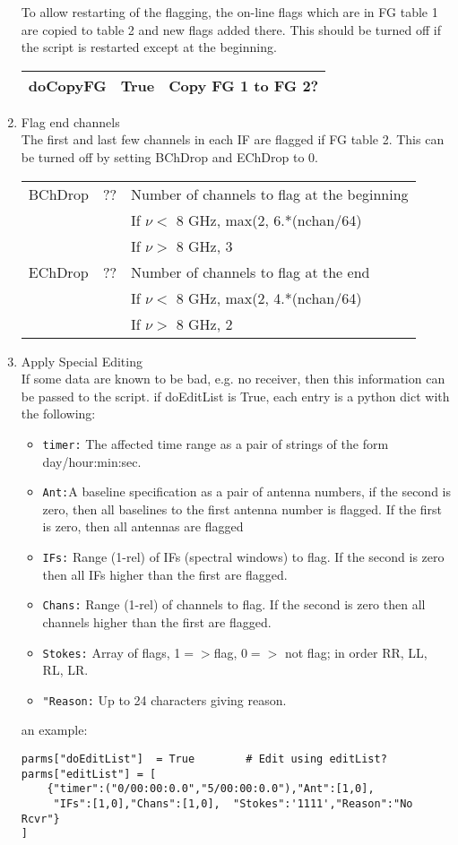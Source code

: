 \documentclass[11pt]{article}
\begin{document}
\begin{enumerate}
To allow restarting of the flagging, the on-line flags which are in FG
table 1 are copied to table 2 and new flags added there.
This should be turned off if the script is restarted except at the beginning.
\begin{center}
\begin{tabular}{|l|c|l|}
\hline
doCopyFG  & True & Copy FG 1 to FG 2? \\
\hline
\end{tabular}
\end{center}
%
\item Flag end channels\\
The first and last few channels in each IF are flagged if FG table 2.
This can be turned off by setting BChDrop and EChDrop to 0.
\begin{center}
\begin{tabular}{|l|c|l|}
\hline
BChDrop  & ?? & Number of channels to flag at the beginning \\
 & & If $\nu<$ 8 GHz, max(2, 6.*(nchan/64)\\
 & & If $\nu>$ 8 GHz, 3\\
EChDrop  & ?? & Number of channels to flag at the end \\
 & & If $\nu<$ 8 GHz, max(2, 4.*(nchan/64)\\
 & & If $\nu>$ 8 GHz, 2\\
\hline
\end{tabular}
\end{center}
%
%
\item Apply Special Editing\\
If some data are known to be bad, e.g. no receiver, then this
information can be passed to the script.
if doEditList is True, each entry is a python dict with the following:
\begin{itemize}
\item{\tt timer:} The affected time range as a pair of strings of the
form day/hour:min:sec.
\item{\tt Ant:}A baseline specification as a pair of antenna numbers,
if the second is zero, then all baselines to the first antenna number
is flagged.  
If the first is zero, then all antennas are flagged
\item{\tt IFs:} Range (1-rel)  of IFs (spectral windows) to flag.
If the second is zero then all IFs higher than the first are flagged.
\item{\tt Chans:} Range (1-rel) of channels to flag.
If the second is zero then all channels higher than the first are flagged.
\item{\tt Stokes:} Array of flags, 1$=>$flag, $0=>$ not flag; in order
  RR, LL, RL, LR.
\item{\tt "Reason:} Up to 24 characters giving reason.
\end{itemize}
an example:
\begin{verbatim}
parms["doEditList"]  = True        # Edit using editList?
parms["editList"] = [
    {"timer":("0/00:00:0.0","5/00:00:0.0"),"Ant":[1,0],
     "IFs":[1,0],"Chans":[1,0],  "Stokes":'1111',"Reason":"No Rcvr"}
]
\end{verbatim}


\end{enumerate}
\end{document}
